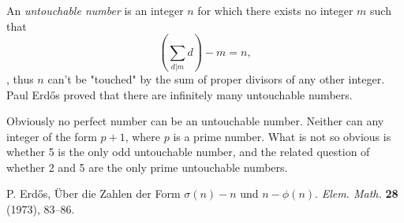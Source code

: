\documentclass[12pt]{article}
\begin{document}
An {\em untouchable number} is an integer $n$ for which there exists no integer $m$ such that \[ \left( \sum_{d\vert m} d \right) - m = n, \], thus $n$ can't be "touched" by the sum of proper divisors of any other integer. Paul Erd\H{o}s proved that there are infinitely many untouchable numbers.

Obviously no perfect number can be an untouchable number. Neither can any integer of the form $p + 1$, where $p$ is a prime number. What is not so obvious is whether 5 is the only odd untouchable number, and the related question of whether 2 and 5 are the only prime untouchable numbers.

\begin{thebibliography}{1}
P. Erd\H{o}s, \"Uber die Zahlen der Form $\sigma(n)-n$ und $n-\phi(n)$.
\emph{Elem. Math.} {\bf 28} (1973), 83--86.
\end{thebibliography}
\end{document}
